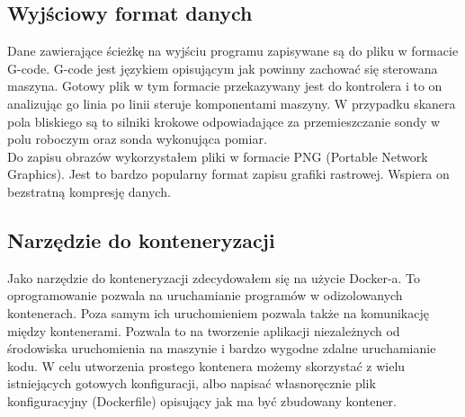 \documentclass[a4paper,12pt,twoside,openany]{report}
\begin{document}
    \subsection{Wyjściowy format danych}
      Dane zawierające ścieżkę na wyjściu programu zapisywane są do pliku w formacie G-code. G-code jest 
      językiem opisującym jak powinny zachować się sterowana maszyna. Gotowy plik w tym formacie przekazywany jest 
      do kontrolera i to on analizując go linia po linii steruje komponentami maszyny. W przypadku skanera 
      pola bliskiego są to silniki krokowe odpowiadające za przemieszczanie sondy w polu roboczym oraz 
      sonda wykonująca pomiar.\\
      Do zapisu obrazów wykorzystałem pliki w formacie PNG (Portable Network Graphics). Jest to bardzo popularny format zapisu 
      grafiki rastrowej. Wspiera on bezstratną kompresję danych.

    \subsection{Narzędzie do konteneryzacji}
      Jako narzędzie do konteneryzacji zdecydowałem się na użycie Docker-a. To oprogramowanie pozwala na 
      uruchamianie programów w odizolowanych kontenerach. Poza samym ich uruchomieniem pozwala także na komunikację 
      między kontenerami. Pozwala to na tworzenie aplikacji niezależnych od środowiska uruchomienia na maszynie
      i bardzo wygodne zdalne uruchamianie kodu. W celu utworzenia prostego kontenera możemy skorzystać z wielu 
      istniejących gotowych konfiguracji, albo napisać własnoręcznie plik konfiguracyjny (Dockerfile) opisujący 
      jak ma być zbudowany kontener.
\end{document}
